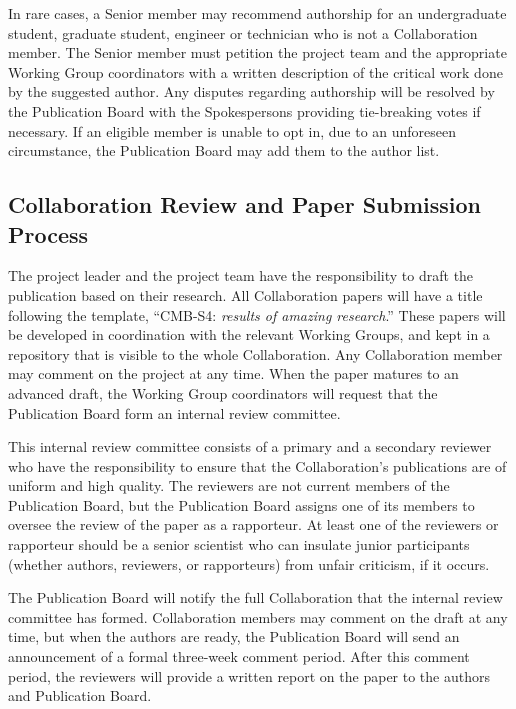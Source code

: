 \documentclass[12pt]{article}
\newcommand\collabname{CMB-S4}
\begin{document}
In rare cases, a Senior member may recommend authorship for an undergraduate student, graduate student, engineer or technician who is not a Collaboration member.  The Senior member must petition the project team and the appropriate Working Group coordinators with a written description of the critical work done by the suggested author. 
Any disputes regarding authorship will be resolved by the Publication Board with the Spokespersons providing  tie-breaking votes if necessary.  If an eligible member is unable to opt in, due to an unforeseen circumstance, the Publication Board may add them to the author list.

\subsection{Collaboration Review and Paper Submission Process}

The project leader and the project team have the responsibility to draft the publication based on their research.  All Collaboration papers will have a title following the template, ``\collabname: \textit{results of amazing research}.''  These papers will be developed in coordination with the relevant Working Groups, and kept in a repository that is visible to the whole Collaboration.  Any Collaboration member may comment on the project at any time.  When the paper matures to an advanced draft, the Working Group coordinators will request that the Publication Board form an internal review committee.  

This internal review committee consists of a primary and a secondary reviewer who have the responsibility to ensure that the Collaboration's publications are of uniform and high quality.  The reviewers are not current members of the Publication Board, but the Publication Board assigns one of its members to oversee the review of the paper as a rapporteur.  At least one of the reviewers or rapporteur should be a senior scientist who can insulate junior participants (whether authors, reviewers, or rapporteurs) from unfair criticism, if it occurs.

The Publication Board will notify the full Collaboration that the internal review committee has formed.  Collaboration members may comment on the draft at any time, but when the authors are ready, the Publication Board will send an announcement of a formal three-week comment period.  After this comment period, the reviewers will provide a written report on the paper to the authors and Publication Board.
\end{document}
